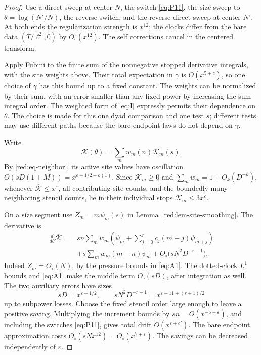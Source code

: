 \begin{proof}
Use a direct sweep at center \(N\), the switch \eqref{eq:P11}, the size
sweep to \(\theta=\log(N'/N)\), the reverse switch, and the reverse
direct sweep at center \(N'\). At both ends the regularization strength
is \(x^{12}\); the clocks differ from the bare data
\((T/\ell^2,0)\) by \(O_\circ(x^{12})\). The self corrections cancel
in the centered transform.

Apply Fubini to the finite sum of the nonnegative stopped derivative
integrals, with the site weights above. Their total expectation in
\(\gamma\) is \(O(x^{5+c})\), so one choice of \(\gamma\) has this
bound up to a fixed constant. The weights can be normalized by their
sum, with an error smaller than any fixed power by increasing the
sum--integral order. The weighted form of \eqref{eq:I} expressly
permits their dependence on \(\theta\). The choice is made for this
one dyad comparison and one test \(s\); different tests may use
different paths because the bare endpoint laws do not depend on
\(\gamma\).

Write
\[
 \overline{\mathcal K}(\theta)=\sum_mw_m(n)\mathcal K_m(s).
\]
By \eqref{red:eq-neighbor}, its active site values have oscillation
\(O(sD(1+M))=x^{\varepsilon+1/2-o(1)}\). Since
\(\mathcal K_m\ge0\) and \(\sum_mw_m=1+O_k(D^{-k})\), whenever
\(\overline{\mathcal K}\le x^\varepsilon\), all contributing site
counts, and the boundedly many neighboring stencil counts, lie in
their individual stops \(\mathcal K_m\le3x^\varepsilon\).

On a size segment use \(Z_m=m\psi_m(s)\) in
Lemma~\ref{red:lem-site-smoothing}. The derivative is
\begin{align*}
 \frac{d}{d\theta}\overline{\mathcal K}
 ={}&sn\sum_mw_m
  \left(\dot\psi_m+\sum_{j=0}^r c_j(m+j)\psi_{m+j}\right)\\
 &+s\sum_mw_m(m-n)\dot\psi_m
   +O_\circ\bigl(sN^2D^{-r-1}\bigr).
\end{align*}
Indeed \(Z_m=O_\circ(N)\), by the pressure bounds in
\eqref{eq:A1}. The dotted-clock \(L^1\) bounds and
\eqref{eq:A1} make the middle term \(O_\circ(sD)\), after integration
as well. The two auxiliary errors have sizes
\[
 sD=x^{\varepsilon+1/2},\qquad
 sN^2D^{-r-1}=x^{\varepsilon-11+(r+1)/2}
\]
up to subpower losses. Choose the fixed stencil order large enough to
leave a positive saving. Multiplying the increment bounds by
\(sn=O(x^{-5+\varepsilon})\), and including the switches
\eqref{eq:P11}, gives total drift
\(O(x^{\varepsilon+c'})\). The bare endpoint approximation costs
\(O_\circ(sN x^{12})=O_\circ(x^{7+\varepsilon})\).
The savings can be decreased independently of \(\varepsilon\).


\end{proof}
